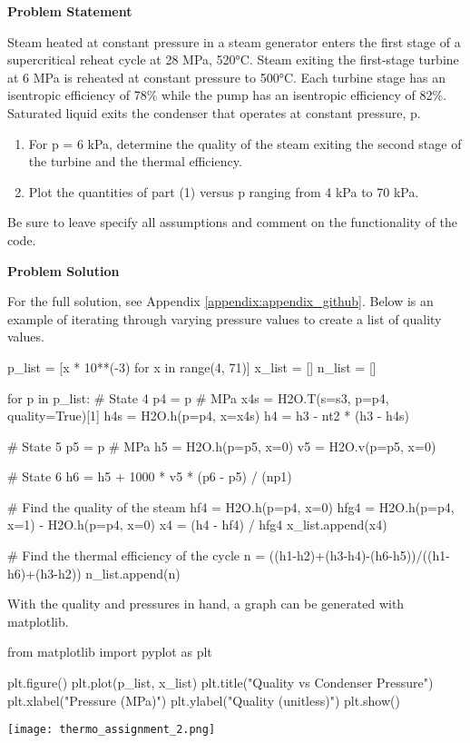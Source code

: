 \begin{tcolorbox}[breakable, enhanced jigsaw, title=ME 513: Assignment \ref{thermo_assignment_2}, 
    colframe=ksu-purple, colback=ksu-gray]

    \textbf{Problem Statement}

    Steam heated at constant pressure in a steam generator enters the first stage of a
    supercritical reheat cycle at 28 MPa, 520°C. Steam exiting the first-stage turbine at 6 MPa is
    reheated at constant pressure to 500°C. Each turbine stage has an isentropic efficiency of 78\%
    while the pump has an isentropic efficiency of 82\%. Saturated liquid exits the condenser that
    operates at constant pressure, p.

    \begin{enumerate}
        \item For p = 6 kPa, determine the quality of the steam exiting the second stage of the 
        turbine and the thermal efficiency.
        \item Plot the quantities of part (1) versus p ranging from 4 kPa to 70 kPa.
    \end{enumerate}

    Be sure to leave specify all assumptions and comment on the functionality of the code. 

    \tcblower
    \textbf{Problem Solution}

    For the full solution, see Appendix \ref{appendix:appendix_github}. Below is an example of 
    iterating through varying pressure values to create a list of quality values.

\begin{python}
p_list = [x * 10**(-3) for x in range(4, 71)]
x_list = []
n_list = []

for p in p_list:
    # State 4
    p4 = p # MPa
    x4s = H2O.T(s=s3, p=p4, quality=True)[1]
    h4s = H2O.h(p=p4, x=x4s)
    h4 = h3 - nt2 * (h3 - h4s)

    # State 5
    p5 = p # MPa
    h5 = H2O.h(p=p5, x=0)
    v5 = H2O.v(p=p5, x=0)

    # State 6
    h6 = h5 + 1000 * v5 * (p6 - p5) / (np1)

    # Find the quality of the steam
    hf4 = H2O.h(p=p4, x=0)
    hfg4 = H2O.h(p=p4, x=1) - H2O.h(p=p4, x=0)
    x4 = (h4 - hf4) / hfg4
    x_list.append(x4)

    # Find the thermal efficiency of the cycle
    n = ((h1-h2)+(h3-h4)-(h6-h5))/((h1-h6)+(h3-h2))
    n_list.append(n)
\end{python}

    With the quality and pressures in hand, a graph can be generated with matplotlib.

\begin{python}
from matplotlib import pyplot as plt

plt.figure()
plt.plot(p_list, x_list)
plt.title("Quality vs Condenser Pressure")
plt.xlabel("Pressure (MPa)")
plt.ylabel("Quality (unitless)")
plt.show()
\end{python}
\texttt{[image: thermo\_assignment\_2.png]}
\end{tcolorbox}

